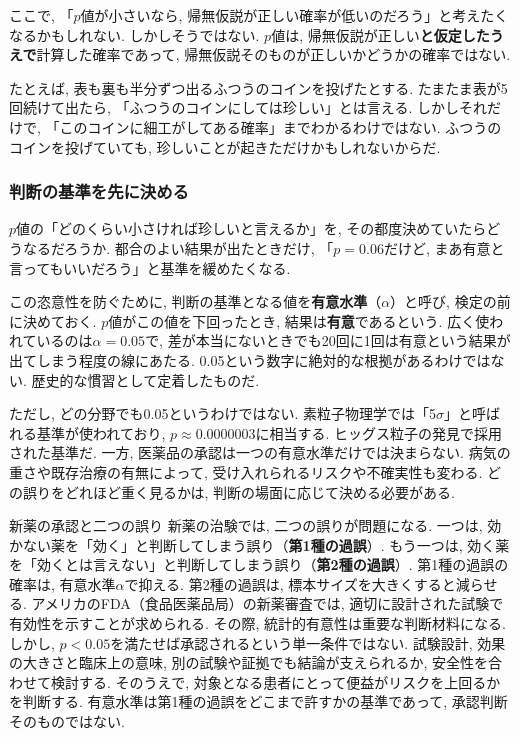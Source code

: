     ここで, 「$p$値が小さいなら, 帰無仮説が正しい確率が低いのだろう」と考えたくなるかもしれない.
    しかしそうではない.
    $p$値は, 帰無仮説が正しい\textbf{と仮定したうえで}計算した確率であって, 帰無仮説そのものが正しいかどうかの確率ではない.

    たとえば, 表も裏も半分ずつ出るふつうのコインを投げたとする.
    たまたま表が5回続けて出たら, 「ふつうのコインにしては珍しい」とは言える.
    しかしそれだけで, 「このコインに細工がしてある確率」までわかるわけではない.
    ふつうのコインを投げていても, 珍しいことが起きただけかもしれないからだ.

    \subsubsection*{判断の基準を先に決める}

    $p$値の「どのくらい小さければ珍しいと言えるか」を, その都度決めていたらどうなるだろうか.
    都合のよい結果が出たときだけ, 「$p = 0.06$だけど, まあ有意と言ってもいいだろう」と基準を緩めたくなる.

    この恣意性を防ぐために, 判断の基準となる値を\textbf{有意水準}（$\alpha$）と呼び, 検定の前に決めておく.
    $p$値がこの値を下回ったとき, 結果は\textbf{有意}であるという.
    広く使われているのは$\alpha = 0.05$で, 差が本当にないときでも20回に1回は有意という結果が出てしまう程度の線にあたる.
    0.05という数字に絶対的な根拠があるわけではない.
    歴史的な慣習として定着したものだ.

    ただし, どの分野でも0.05というわけではない.
    素粒子物理学では「5$\sigma$」と呼ばれる基準が使われており, $p \approx 0.0000003$に相当する.
    ヒッグス粒子の発見で採用された基準だ.
    一方, 医薬品の承認は一つの有意水準だけでは決まらない.
    病気の重さや既存治療の有無によって, 受け入れられるリスクや不確実性も変わる.
    どの誤りをどれほど重く見るかは, 判断の場面に応じて決める必要がある.

    \begin{mybox}{新薬の承認と二つの誤り}
      新薬の治験では, 二つの誤りが問題になる.
      一つは, 効かない薬を「効く」と判断してしまう誤り（\textbf{第1種の過誤}）.
      もう一つは, 効く薬を「効くとは言えない」と判断してしまう誤り（\textbf{第2種の過誤}）.
      第1種の過誤の確率は, 有意水準$\alpha$で抑える.
      第2種の過誤は, 標本サイズを大きくすると減らせる.
      アメリカのFDA（食品医薬品局）の新薬審査では, 適切に設計された試験で有効性を示すことが求められる.
      その際, 統計的有意性は重要な判断材料になる.
      しかし, $p < 0.05$を満たせば承認されるという単一条件ではない.
      試験設計, 効果の大きさと臨床上の意味, 別の試験や証拠でも結論が支えられるか, 安全性を合わせて検討する.
      そのうえで, 対象となる患者にとって便益がリスクを上回るかを判断する.\footnotemark
      有意水準は第1種の過誤をどこまで許すかの基準であって, 承認判断そのものではない.
    \end{mybox}


